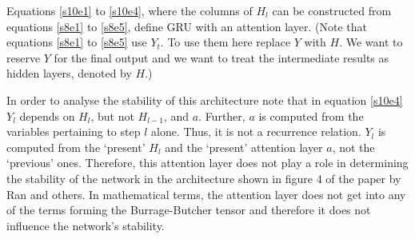 \documentclass{article}
\numberwithin{equation}{section}
\begin{document}
Equations \eqref{s10e1} to \eqref{s10e4}, where the columns of $H_l$ can be
constructed from equations \eqref{s8e1} to \eqref{s8e5}, define GRU with 
an attention layer.  (Note that equations \eqref{s8e1} to \eqref{s8e5} use 
$Y_t$. To use them here replace $Y$ with $H$. We want to reserve $Y$ for 
the final output and we want to treat the intermediate results as hidden 
layers, denoted by $H$.)

In order to analyse the stability of this architecture note that in equation
\eqref{s10e4} $Y_l$ depends on $H_l$, but not $H_{l-1}$, and $a$. Further,
$a$ is computed from the variables pertaining to step $l$ alone.
Thus, it is not a recurrence relation. $Y_l$ is computed from the
`present' $H_l$ and the `present' attention layer $a$, not the `previous' 
ones. Therefore, this attention layer does not play a role in determining 
the stability of the network in the architecture shown in figure 4 of the 
paper \cite{ran2019lstm} by Ran and others. In mathematical terms, the
attention layer does not get into any of the terms forming the 
Burrage-Butcher tensor and therefore it does not influence the network's 
stability.
\end{document}
